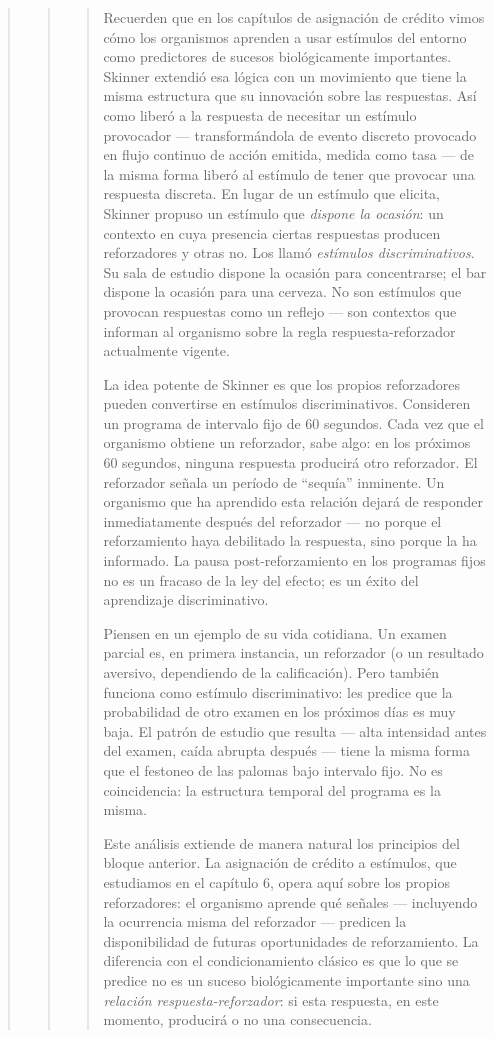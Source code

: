 \documentclass[
  letterpaper,
  DIV=11,
  numbers=noendperiod]{scrreprt}
\begin{document}
\begin{tcolorbox}[enhanced jigsaw, arc=.35mm, bottomrule=.15mm, breakable, colback=white, colframe=quarto-callout-note-color-frame, left=2mm, leftrule=.75mm, opacityback=0, rightrule=.15mm, toprule=.15mm]
\begin{quote}
\begin{quote}
\begin{quote}
Recuerden que en los capítulos de asignación de crédito vimos cómo los
organismos aprenden a usar estímulos del entorno como predictores de
sucesos biológicamente importantes. Skinner extendió esa lógica con un
movimiento que tiene la misma estructura que su innovación sobre las
respuestas. Así como liberó a la respuesta de necesitar un estímulo
provocador --- transformándola de evento discreto provocado en flujo
continuo de acción emitida, medida como tasa --- de la misma forma
liberó al estímulo de tener que provocar una respuesta discreta. En
lugar de un estímulo que elicita, Skinner propuso un estímulo que
\emph{dispone la ocasión}: un contexto en cuya presencia ciertas
respuestas producen reforzadores y otras no. Los llamó \emph{estímulos
discriminativos}. Su sala de estudio dispone la ocasión para
concentrarse; el bar dispone la ocasión para una cerveza. No son
estímulos que provocan respuestas como un reflejo --- son contextos que
informan al organismo sobre la regla respuesta-reforzador actualmente
vigente.

La idea potente de Skinner es que los propios reforzadores pueden
convertirse en estímulos discriminativos. Consideren un programa de
intervalo fijo de 60 segundos. Cada vez que el organismo obtiene un
reforzador, sabe algo: en los próximos 60 segundos, ninguna respuesta
producirá otro reforzador. El reforzador señala un período de ``sequía''
inminente. Un organismo que ha aprendido esta relación dejará de
responder inmediatamente después del reforzador --- no porque el
reforzamiento haya debilitado la respuesta, sino porque la ha informado.
La pausa post-reforzamiento en los programas fijos no es un fracaso de
la ley del efecto; es un éxito del aprendizaje discriminativo.

Piensen en un ejemplo de su vida cotidiana. Un examen parcial es, en
primera instancia, un reforzador (o un resultado aversivo, dependiendo
de la calificación). Pero también funciona como estímulo discriminativo:
les predice que la probabilidad de otro examen en los próximos días es
muy baja. El patrón de estudio que resulta --- alta intensidad antes del
examen, caída abrupta después --- tiene la misma forma que el festoneo
de las palomas bajo intervalo fijo. No es coincidencia: la estructura
temporal del programa es la misma.

Este análisis extiende de manera natural los principios del bloque
anterior. La asignación de crédito a estímulos, que estudiamos en el
capítulo 6, opera aquí sobre los propios reforzadores: el organismo
aprende qué señales --- incluyendo la ocurrencia misma del reforzador
--- predicen la disponibilidad de futuras oportunidades de
reforzamiento. La diferencia con el condicionamiento clásico es que lo
que se predice no es un suceso biológicamente importante sino una
\emph{relación respuesta-reforzador}: si esta respuesta, en este
momento, producirá o no una consecuencia.


\end{quote}
\end{quote}
\end{quote}
\end{tcolorbox}
\end{document}
